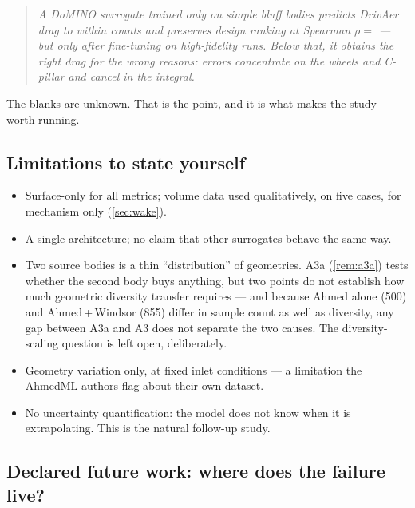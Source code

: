 \documentclass[10pt,a4paper]{article}
\theoremstyle{definition}
\begin{document}
\begin{quote}
\emph{A DoMINO surrogate trained only on simple bluff bodies predicts DrivAer drag
to within \underline{\hspace{1.2cm}} counts and preserves design ranking at Spearman
$\rho =$ \underline{\hspace{1cm}} --- but only after fine-tuning on
\underline{\hspace{0.9cm}} high-fidelity runs. Below that, it obtains the right drag
for the wrong reasons: errors concentrate on the wheels and C-pillar and cancel in
the integral.}
\end{quote}

The blanks are unknown. That is the point, and it is what makes the study worth
running.

\subsection{Limitations to state yourself}

\begin{itemize}
  \item Surface-only for all metrics; volume data used qualitatively, on five cases,
  for mechanism only (\cref{sec:wake}).
  \item A single architecture; no claim that other surrogates behave the same way.
  \item Two source bodies is a thin ``distribution'' of geometries. A3a
  (\cref{rem:a3a}) tests whether the second body buys anything, but two points do not
  establish how much geometric diversity transfer requires --- and because Ahmed alone
  (500) and Ahmed\,+\,Windsor (855) differ in sample count as well as diversity, any
  gap between A3a and A3 does not separate the two causes. The diversity-scaling
  question is left open, deliberately.
  \item Geometry variation only, at fixed inlet conditions --- a limitation the
  AhmedML authors flag about their own dataset.
  \item No uncertainty quantification: the model does not know when it is
  extrapolating. This is the natural follow-up study.
\end{itemize}

\subsection{Declared future work: where does the failure live?}
\label{sec:ablation}
\end{document}
